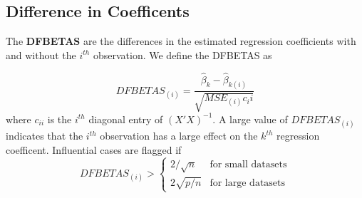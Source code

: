 \subsection{Difference in Coefficents}

The \textbf{DFBETAS} are the differences in the estimated regression coefficients with and without the $i^{th}$ observation. We define the DFBETAS as

\[DFBETAS_{(i)} = \frac{\hat{\beta}_k - \hat{\beta}_{k(i)}}{\sqrt{MSE_{(i)}c_ii}}\]
where $c_{ii}$ is the $i^{th}$ diagonal entry of $(X'X)^{-1}$. A large value of $DFBETAS_{(i)}$ indicates that the $i^{th}$ observation has a large effect on the $k^{th}$ regression coefficent. Influential cases are flagged if
\[DFBETAS_{(i)} > \begin{cases}
    2/\sqrt{n} & \text{for small datasets} \\
    2\sqrt{p/n} & \text{for large datasets}
\end{cases}\]
